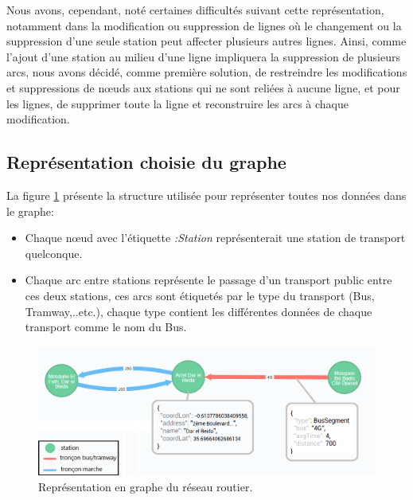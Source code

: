 \begin{itemize}
	Nous avons, cependant, noté certaines difficultés suivant cette représentation, notamment dans la modification ou suppression de lignes où le changement ou la suppression d'une seule station peut affecter plusieurs autres lignes.\newline
	Ainsi, comme l'ajout d'une station au milieu d'une ligne impliquera la suppression de plusieurs arcs, nous avons décidé, comme première solution, de restreindre les modifications et suppressions de nœuds aux stations qui ne sont reliées à aucune ligne, et pour les lignes, de supprimer toute la ligne et reconstruire les arcs à chaque modification.
	     
\end{itemize}
\subsection{Représentation choisie du graphe}
La figure \ref{fig:structGraph} présente la structure utilisée pour représenter toutes nos données dans le graphe:
\begin{itemize}
	\item Chaque nœud avec l'étiquette \emph{:Station} représenterait une station de transport quelconque.
	\item Chaque arc entre stations représente le passage d'un transport public entre ces deux stations, ces arcs sont étiquetés par le type du transport (Bus, Tramway,..etc.), chaque type contient les différentes données de chaque transport comme le nom du Bus.
\end{itemize}

\begin{figure}[h!]
	\center
	\includegraphics[width=\textwidth]{img/structureGraphe.png}
	\caption{Représentation en graphe du réseau routier.}
	\label{fig:structGraph}
\end{figure}

